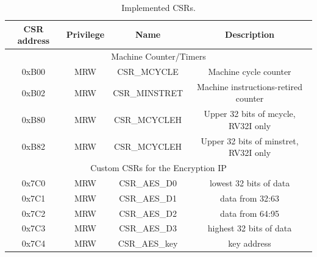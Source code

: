 \documentclass[../main.tex]{subfiles}
\begin{document}
\begin{table}[t!]
\centering
\begin{tabular}{ |c|c|c|c| } 
\hline
CSR address & Privilege & Name & Description \\
\hline
\multicolumn{4}{|c|}{Machine Counter/Timers}\\
\hline
0xB00 & MRW & CSR\_MCYCLE & Machine cycle counter\\
0xB02 & MRW & CSR\_MINSTRET & Machine instructions-retired counter\\
0xB80 & MRW & CSR\_MCYCLEH & Upper 32 bits of mcycle, RV32I only\\
0xB82 & MRW & CSR\_MCYCLEH & Upper 32 bits of minstret, RV32I only\\
\hline
\multicolumn{4}{|c|}{Custom CSRs for the Encryption IP}\\
\hline
0x7C0 & MRW & CSR\_AES\_D0 & lowest 32 bits of data\\
0x7C1 & MRW & CSR\_AES\_D1 & data from 32:63\\
0x7C2 & MRW & CSR\_AES\_D2 & data from 64:95\\
0x7C3 & MRW & CSR\_AES\_D3 & highest 32 bits of data\\
0x7C4 & MRW & CSR\_AES\_key & key address\\
\hline
\end{tabular}
\caption{Implemented CSRs.}
\label{tab:CSRs2}
\end{table}
\end{document}

